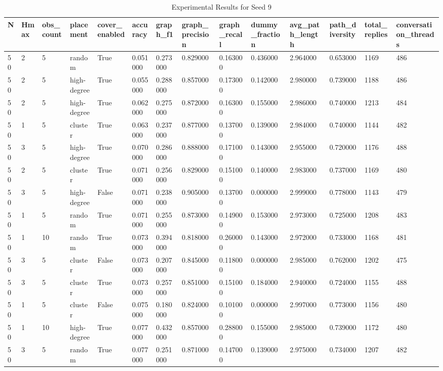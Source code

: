\begin{table}
\caption{Experimental Results for Seed 9}
\label{tab:results_seed_9}
\begin{tabular}{llllllllllllll}
\toprule
N & Hmax & obs_count & placement & cover_enabled & accuracy & graph_f1 & graph_precision & graph_recall & dummy_fraction & avg_path_length & path_diversity & total_replies & conversation_threads \\
\midrule
50 & 2 & 5 & random & True & 0.051000 & 0.273000 & 0.829000 & 0.163000 & 0.436000 & 2.964000 & 0.653000 & 1169 & 486 \\
50 & 2 & 5 & high-degree & True & 0.055000 & 0.288000 & 0.857000 & 0.173000 & 0.142000 & 2.980000 & 0.739000 & 1188 & 486 \\
50 & 2 & 5 & high-degree & True & 0.062000 & 0.275000 & 0.872000 & 0.163000 & 0.155000 & 2.986000 & 0.740000 & 1213 & 484 \\
50 & 1 & 5 & cluster & True & 0.063000 & 0.237000 & 0.877000 & 0.137000 & 0.139000 & 2.984000 & 0.740000 & 1144 & 482 \\
50 & 3 & 5 & high-degree & True & 0.070000 & 0.286000 & 0.888000 & 0.171000 & 0.143000 & 2.955000 & 0.720000 & 1176 & 488 \\
50 & 2 & 5 & cluster & True & 0.071000 & 0.256000 & 0.829000 & 0.151000 & 0.140000 & 2.983000 & 0.737000 & 1169 & 480 \\
50 & 3 & 5 & high-degree & False & 0.071000 & 0.238000 & 0.905000 & 0.137000 & 0.000000 & 2.999000 & 0.778000 & 1143 & 479 \\
50 & 1 & 5 & random & True & 0.071000 & 0.255000 & 0.873000 & 0.149000 & 0.153000 & 2.973000 & 0.725000 & 1208 & 483 \\
50 & 1 & 10 & random & True & 0.073000 & 0.394000 & 0.818000 & 0.260000 & 0.143000 & 2.972000 & 0.733000 & 1168 & 481 \\
50 & 3 & 5 & cluster & False & 0.073000 & 0.207000 & 0.845000 & 0.118000 & 0.000000 & 2.985000 & 0.762000 & 1202 & 475 \\
50 & 3 & 5 & cluster & True & 0.073000 & 0.257000 & 0.851000 & 0.151000 & 0.184000 & 2.940000 & 0.724000 & 1155 & 488 \\
50 & 1 & 5 & cluster & False & 0.075000 & 0.180000 & 0.824000 & 0.101000 & 0.000000 & 2.997000 & 0.773000 & 1156 & 480 \\
50 & 1 & 10 & high-degree & True & 0.077000 & 0.432000 & 0.857000 & 0.288000 & 0.155000 & 2.985000 & 0.739000 & 1172 & 480 \\
50 & 3 & 5 & random & True & 0.077000 & 0.251000 & 0.871000 & 0.147000 & 0.139000 & 2.975000 & 0.734000 & 1207 & 482 \\

\end{tabular}
\end{table}
